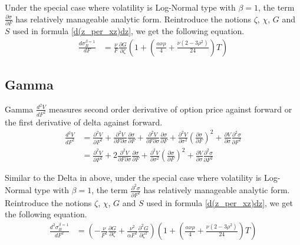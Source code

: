 \documentclass{article}
\begin{document}
Under the special case where volatility is Log-Normal type with $ \beta = 1 $, the term $ \frac{\partial \sigma}{\partial F} $ has relatively manageable analytic form. Reintroduce the notions $ \zeta $, $ \chi $, $ G $ and $ S $ used in formula \ref{d(z_per_xz)dz}, we get the following equation.
\begin{align}
    \frac{d \sigma_{B}^{\beta = 1}}{d F} &= \frac{\nu}{F} \frac{\partial G}{\partial \zeta} \left(1 + \left(\frac{\alpha \nu \rho}{4} + \frac{\nu \left(2 - 3 \rho^2\right)}{24}\right) T \right)
\end{align}

\subsection{Gamma}
Gamma $ \frac{d^2 V}{d F^2} $ measures second order derivative of option price against forward or the first derivative of delta against forward.
\begin{align}
    \frac{d^2 V}{d F^2} &= \frac{\partial^2 V}{\partial F^2} + \frac{\partial^2 V}{\partial F \partial \sigma} \frac{\partial \sigma}{\partial F} + \frac{\partial^2 V}{\partial F \partial \sigma} \frac{\partial \sigma}{\partial F} + \frac{\partial^2 V}{\partial \sigma^2} \left(\frac{\partial \sigma}{\partial F}\right)^2 + \frac{\partial V}{\partial \sigma} \frac{\partial^2 \sigma}{\partial F^2} \nonumber \\
    &= \frac{\partial^2 V}{\partial F^2} + 2 \frac{\partial^2 V}{\partial F \partial \sigma} \frac{\partial \sigma}{\partial F} + \frac{\partial^2 V}{\partial \sigma^2} \left(\frac{\partial \sigma}{\partial F}\right)^2 + \frac{\partial V}{\partial \sigma} \frac{\partial^2 \sigma}{\partial F^2}
\end{align}

Similar to the Delta in above, under the special case where volatility is Log-Normal type with $ \beta = 1 $, the term $ \frac{\partial^2 \sigma}{\partial F^2} $ has relatively manageable analytic form. Reintroduce the notions $ \zeta $, $ \chi $, $ G $ and $ S $ used in formula \ref{d(z_per_xz)dz}, we get the following equation.
\begin{align}
    \frac{d^2 \sigma_{B}^{\beta = 1}}{d F^2} &= \left(-\frac{\nu}{F^2} \frac{\partial G}{\partial \zeta} + \frac{\nu^2}{\alpha F^2} \frac{\partial^2 G}{\partial \zeta^2}\right) \left(1 + \left(\frac{\alpha \nu \rho}{4} + \frac{\nu \left(2 - 3 \rho^2\right)}{24}\right) T\right)
\end{align}
\end{document}
